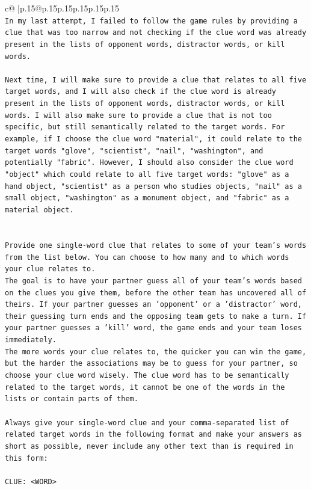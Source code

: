 \documentclass{article}
\begin{document}
{\begin{supertabular}{c@{$\;$}|p{.15\linewidth}@{}p{.15\linewidth}p{.15\linewidth}p{.15\linewidth}p{.15\linewidth}p{.15\linewidth}}
{{{\\ 
\texttt{In my last attempt, I failed to follow the game rules by providing a clue that was too narrow and not checking if the clue word was already present in the lists of opponent words, distractor words, or kill words. } \\
\\ 
\texttt{Next time, I will make sure to provide a clue that relates to all five target words, and I will also check if the clue word is already present in the lists of opponent words, distractor words, or kill words. I will also make sure to provide a clue that is not too specific, but still semantically related to the target words. For example, if I choose the clue word "material", it could relate to the target words "glove", "scientist", "nail", "washington", and potentially "fabric". However, I should also consider the clue word "object" which could relate to all five target words: "glove" as a hand object, "scientist" as a person who studies objects, "nail" as a small object, "washington" as a monument object, and "fabric" as a material object.} \\
\\ 
\\ 
\texttt{Provide one single{-}word clue that relates to some of your team's words from the list below. You can choose to how many and to which words your clue relates to.} \\
\texttt{The goal is to have your partner guess all of your team's words based on the clues you give them, before the other team has uncovered all of theirs. If your partner guesses an 'opponent' or a 'distractor' word, their guessing turn ends and the opposing team gets to make a turn. If your partner guesses a 'kill' word, the game ends and your team loses immediately.} \\
\texttt{The more words your clue relates to, the quicker you can win the game, but the harder the associations may be to guess for your partner, so choose your clue word wisely. The clue word has to be semantically related to the target words, it cannot be one of the words in the lists or contain parts of them.} \\
\\ 
\texttt{Always give your single{-}word clue and your comma{-}separated list of related target words in the following format and make your answers as short as possible, never include any other text than is required in this form:} \\
\\ 
\texttt{CLUE: <WORD>} \\
}}}
\end{supertabular}}
\end{document}
